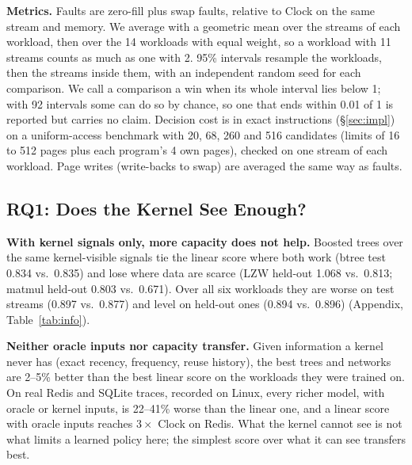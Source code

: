 \documentclass{article}
\newcommand{\clock}{Clock\xspace}
\newcommand{\finding}[1]{\textbf{#1}\hspace{0.4em}}
\begin{document}
\finding{Metrics.} Faults are zero-fill plus swap faults, relative to \clock on the same
stream and memory. We average with a geometric mean over the streams of each workload,
then over the 14 workloads with equal weight, so a workload with 11 streams counts as much
as one with 2. 95\% intervals resample the workloads, then the streams inside them, with an
independent random seed for each comparison. We call a comparison a win when its whole
interval lies below 1; with 92 intervals some can do so by chance, so one that ends within
0.01 of 1 is reported but carries no claim. Decision cost is in exact instructions (\S\ref{sec:impl})
on a uniform-access benchmark with 20, 68, 260 and 516 candidates (limits of 16 to 512
pages plus each program's 4 own pages), checked on one stream of each workload. Page
writes (write-backs to swap) are averaged the same way as faults.



\subsection{RQ1: Does the Kernel See Enough?}
\label{sec:eval-info}

\finding{With kernel signals only, more capacity does not help.} Boosted trees over the
same kernel-visible signals tie the linear score where both work (btree test 0.834 vs.\
0.835) and lose where data are scarce (LZW held-out 1.068 vs.\ 0.813; matmul held-out
0.803 vs.\ 0.671). Over all six workloads they are worse on test streams (0.897 vs.\
0.877) and level on held-out ones (0.894 vs.\ 0.896) (Appendix, Table~\ref{tab:info}).

\finding{Neither oracle inputs nor capacity transfer.} Given information a kernel never
has (exact recency, frequency, reuse history), the best trees and networks are 2--5\%
better than the best linear score on the workloads they were trained on. On real Redis
and SQLite traces, recorded on Linux, every richer model, with oracle or kernel inputs, is
22--41\% worse than the linear one, and a linear score with oracle inputs reaches
$3\times$ \clock on Redis. What the kernel cannot see is not what limits a learned policy
here; the simplest score over what it can see transfers best.
\end{document}
